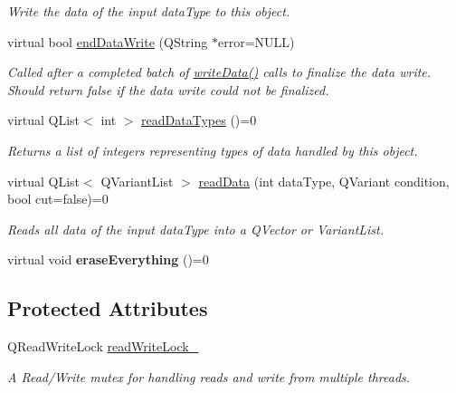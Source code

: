 \begin{DoxyCompactItemize}
\begin{DoxyCompactList}\small\item\em Write the data of the input data\-Type to this object. \end{DoxyCompactList}\item 
virtual bool \hyperlink{class_session_data_aae9d3e70ed86c81f56f5c063d1a2ff2f}{end\-Data\-Write} (Q\-String $\ast$error=N\-U\-L\-L)
\begin{DoxyCompactList}\small\item\em Called after a completed batch of \hyperlink{class_session_data_ad05a594d8410d638f1a066bfa5a10ba3}{write\-Data()} calls to finalize the data write. Should return false if the data write could not be finalized. \end{DoxyCompactList}\item 
virtual Q\-List$<$ int $>$ \hyperlink{class_session_data_a4b879f10ecfbfcaa12c2dbbc1b15bdff}{read\-Data\-Types} ()=0
\begin{DoxyCompactList}\small\item\em Returns a list of integers representing types of data handled by this object. \end{DoxyCompactList}\item 
virtual Q\-List$<$ Q\-Variant\-List $>$ \hyperlink{class_session_data_a81f4eb49b8a23eb9c1a1575abc2fad4c}{read\-Data} (int data\-Type, Q\-Variant condition, bool cut=false)=0
\begin{DoxyCompactList}\small\item\em Reads all data of the input data\-Type into a Q\-Vector or Variant\-List. \end{DoxyCompactList}\item 
\hypertarget{class_session_data_a002c8f0b7437729ba8f04edf2e91bc06}{virtual void {\bfseries erase\-Everything} ()=0}\label{class_session_data_a002c8f0b7437729ba8f04edf2e91bc06}

\end{DoxyCompactItemize}
\subsection*{Protected Attributes}
\begin{DoxyCompactItemize}
\item 
\hypertarget{class_session_data_a4f56f91d83e09645d853339fe5067181}{Q\-Read\-Write\-Lock \hyperlink{class_session_data_a4f56f91d83e09645d853339fe5067181}{read\-Write\-Lock\-\_\-}}\label{class_session_data_a4f56f91d83e09645d853339fe5067181}

\begin{DoxyCompactList}\small\item\em A Read/\-Write mutex for handling reads and write from multiple threads. \end{DoxyCompactList}\end{DoxyCompactItemize}
